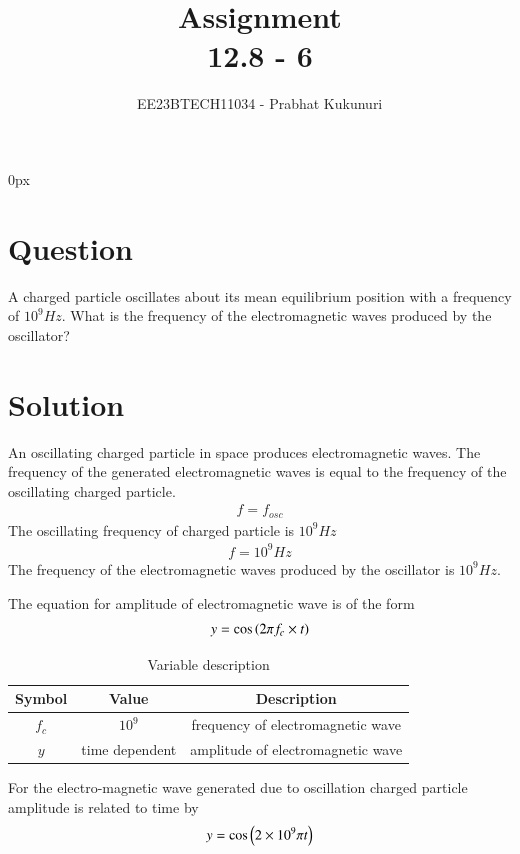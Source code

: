 \documentclass[journal,12pt,twocolumn]{IEEEtran}
\theoremstyle{remark}
\begin{document}
\parindent 0px


\title{Assignment\\[1ex]12.8 - 6}
\author{EE23BTECH11034 - Prabhat Kukunuri$^{}$%
}
\maketitle
\newpage
\bigskip

\renewcommand{\thefigure}{\theenumi}
\renewcommand{\thetable}{\theenumi}
\section*{Question}
A charged particle oscillates about its mean equilibrium position with a frequency of $10^9Hz$. What is the frequency of the electromagnetic waves produced by the oscillator?

\section*{Solution}
An oscillating charged particle in space produces electromagnetic waves. The frequency of the generated electromagnetic waves is equal to the frequency of the oscillating charged particle.
\begin{align}
    f = f_{osc}
\end{align}
The oscillating frequency of charged particle is $10^9Hz$
\begin{align}
    f = 10^9Hz
\end{align}
The frequency of the electromagnetic waves produced by the oscillator is $10^9Hz$.

The equation for amplitude of electromagnetic wave is of the form 
\begin{align}
    y = \cos\left(2{\pi}f_c\times t\right)
\end{align}
\begin{table}[h]
    \centering
    \begin{tabular}{|c|c|c|}
    \hline
   Symbol&Value&Description\\ \hline
   $f_c$&$10^9$&frequency of electromagnetic wave\\ \hline
   $y$&time dependent&amplitude of electromagnetic wave\\ \hline
    \end{tabular}
    \caption{Variable description}
    \label{tab:12.8.6.1}
\end{table}

For the electro-magnetic wave generated due to oscillation charged particle amplitude is related to time by
\begin{align}
    y = \cos\left(2\times10^9{\pi}t\right)
\end{align}
\end{document}
